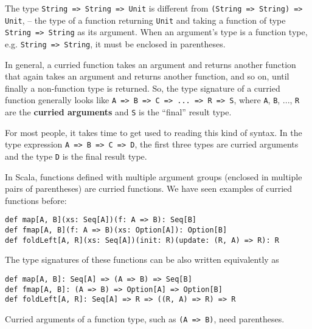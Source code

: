 The type \lstinline!String => String => Unit!
is different from \lstinline!(String => String) => Unit!,
– the type of a function returning \lstinline!Unit!
and taking a function of type \lstinline!String => String!
as its argument. When an argument's type is a function type, e.g.
\lstinline!String => String!,
it must be enclosed in parentheses.

In general, a curried function takes an argument and returns another
function that again takes an argument and returns another function,
and so on, until finally a non-function type is returned. So, the
type signature of a curried function generally looks like \lstinline!A => B => C => ... => R => S!,
where \lstinline!A!, \lstinline!B!,
..., \lstinline!R! are
the \textbf{curried arguments} and \lstinline!S!
is the ``final'' result type.

For most people, it takes time to get used to reading this kind of
syntax. In the type expression \lstinline!A => B => C => D!,
the first three types are curried arguments and the type \lstinline!D!
is the final result type.

In Scala, functions defined with multiple argument groups (enclosed
in multiple pairs of parentheses) are curried functions. We have seen
examples of curried functions before:
\begin{lstlisting}
def map[A, B](xs: Seq[A])(f: A => B): Seq[B]
def fmap[A, B](f: A => B)(xs: Option[A]): Option[B]
def foldLeft[A, R](xs: Seq[A])(init: R)(update: (R, A) => R): R
\end{lstlisting}
The type signatures of these functions can be also written equivalently
as
\begin{lstlisting}
def map[A, B]: Seq[A] => (A => B) => Seq[B]
def fmap[A, B]: (A => B) => Option[A] => Option[B]
def foldLeft[A, R]: Seq[A] => R => ((R, A) => R) => R
\end{lstlisting}
Curried arguments of a function type, such as \lstinline!(A => B)!,
need parentheses.

